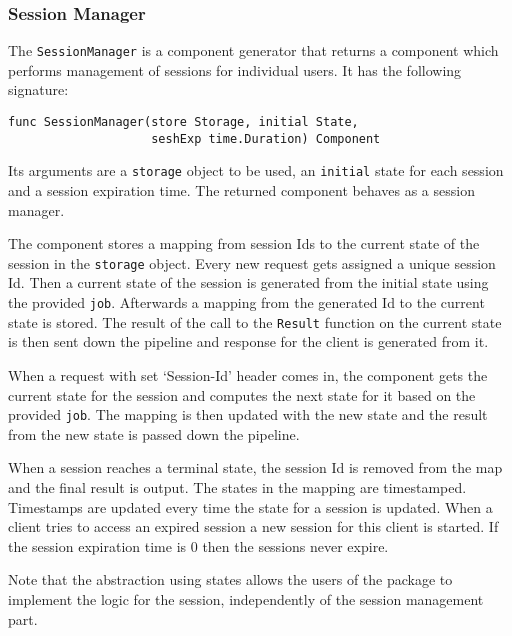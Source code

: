\subsubsection{Session Manager}
The \texttt{SessionManager} is a component generator that returns a component
which performs management of sessions for individual users. It has the following signature:
\begin{lstlisting}
func SessionManager(store Storage, initial State, 
                    seshExp time.Duration) Component
\end{lstlisting}
Its arguments are a \texttt{storage} object to be used, an \texttt{initial} 
state for each session and a session expiration time.
The returned component behaves as a session manager. 

The component stores a mapping from session Ids to the current state of the session
in the \texttt{storage} object.
Every new request gets assigned a unique session Id. Then a current state
of the session is generated from the initial state using the provided
\texttt{job}. Afterwards a mapping from the generated Id to the current state
is stored. The result of the call to the \texttt{Result} function on the
current state is then sent down the pipeline and response for the client 
is generated from it.

When a request with set `Session-Id' header comes in, the component gets the current 
state for the session and computes the next state for it based on the provided 
\texttt{job}.
The mapping is then updated with the new state and the result from the new state
is passed down the pipeline.

When a session reaches a terminal state, the session Id is removed from the map
and the final result is output.
The states in the mapping are timestamped. Timestamps are updated every time
the state for a session is updated. When a client tries to access an expired
session a new session for this client is started. If the session expiration
time is 0 then the sessions never expire.

Note that the abstraction using states allows the users of the 
package to implement the logic for the session, independently of 
the session management part.

